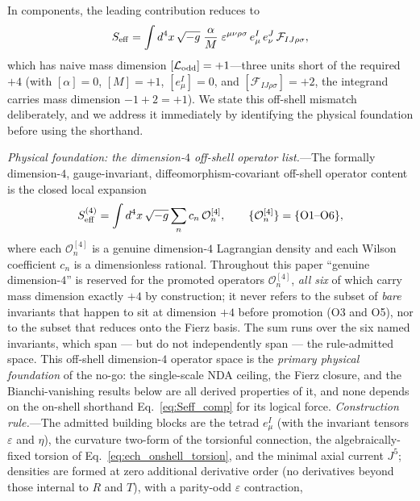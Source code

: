\documentclass[aps,prd,twocolumn,superscriptaddress,showpacs,preprintnumbers,nofootinbib,longbibliography,floatfix]{revtex4-2}
\begin{document}
In components, the leading contribution reduces to
\begin{equation}\label{eq:Seff_comp}
S_{\rm eff} = \int d^4x\,\sqrt{-g}\;\frac{\alpha}{M}\;\varepsilon^{\mu\nu\rho\sigma}\,e^I_\mu\,e^J_\nu\,\mathcal{F}_{IJ\rho\sigma},
\end{equation}
which has naive mass dimension $[\mathcal{L}_{\rm odd}] = +1$---three units
short of the required $+4$ (with $[\alpha]=0$, $[M]=+1$, $[e^I_\mu]=0$, and
$[\mathcal{F}_{IJ\rho\sigma}]=+2$, the integrand carries mass dimension
$-1+2=+1$). We state this off-shell mismatch deliberately, and we address it
immediately by identifying the physical foundation before using the shorthand.

\emph{Physical foundation: the dimension-$4$ off-shell operator list.}---The
formally dimension-$4$, gauge-invariant, diffeomorphism-covariant off-shell
operator content is the closed local expansion
\begin{equation}\label{eq:Seff_dim4}
S_{\rm eff}^{(4)} = \int d^4x\,\sqrt{-g}\sum_{n} c_n\,\mathcal{O}_n^{[4]},
\qquad \{\mathcal{O}_n^{[4]}\}=\{\mathrm{O1}\text{--}\mathrm{O6}\},
\end{equation}
where each $\mathcal{O}_n^{[4]}$ is a genuine dimension-$4$ Lagrangian
density and each Wilson coefficient $c_n$ is a dimensionless rational.
Throughout this paper ``genuine dimension-$4$'' is reserved for the
promoted operators $\mathcal{O}_n^{[4]}$, \emph{all six} of which carry
mass dimension exactly $+4$ by construction; it never refers to the
subset of \emph{bare} invariants that happen to sit at dimension $+4$
before promotion (O3 and O5), nor to the subset that reduces onto the
Fierz basis.
The sum runs over the six named invariants, which span --- but do not
independently span --- the rule-admitted space. This off-shell
dimension-$4$ operator space is the \emph{primary physical foundation} of
the no-go: the single-scale NDA ceiling, the Fierz closure, and the
Bianchi-vanishing results below are all derived properties of it, and
none depends on the on-shell shorthand Eq.~\eqref{eq:Seff_comp} for its
logical force.
\emph{Construction rule.}---The admitted building blocks are the tetrad
$e^I_\mu$ (with the invariant tensors $\varepsilon$ and $\eta$), the
curvature two-form of the torsionful connection, the algebraically-fixed
torsion of Eq.~\eqref{eq:ech_onshell_torsion},
and the minimal axial current $J^5$; densities are
formed at zero additional derivative order (no derivatives beyond those
internal to $R$ and $T$), with a parity-odd $\varepsilon$ contraction,
\end{document}
